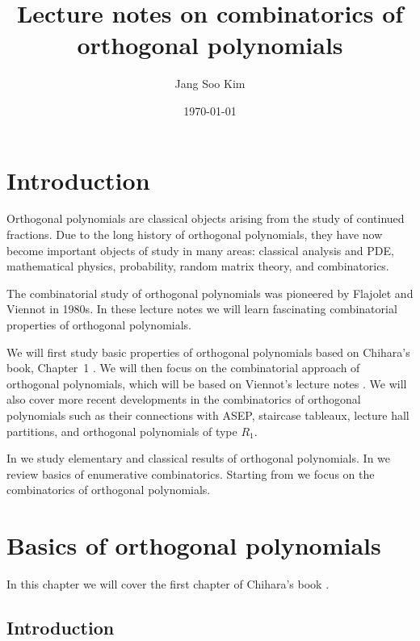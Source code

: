 \documentclass[oneside]{book}
\title{Lecture notes on combinatorics of orthogonal polynomials}
\author{Jang Soo Kim}
\date{\today}
\numberwithin{equation}{section}
\theoremstyle{definition}
\begin{document}


\maketitle
\tableofcontents


\chapter{Introduction}

Orthogonal polynomials are classical objects arising from the study of
continued fractions. Due to the long history of orthogonal
polynomials, they have now become important objects of study in many
areas: classical analysis and PDE, mathematical physics, probability,
random matrix theory, and combinatorics.

The combinatorial study of orthogonal polynomials was pioneered by
Flajolet and Viennot in 1980s. In these lecture notes we will learn
fascinating combinatorial properties of orthogonal polynomials.

We will first study basic properties of orthogonal polynomials based
on Chihara's book, Chapter~1 \cite{Chihara}. We will then focus on the
combinatorial approach of orthogonal polynomials, which will be based
on Viennot's lecture notes \cite{ViennotLN}. We will also cover more
recent developments in the combinatorics of orthogonal polynomials
such as their connections with ASEP, staircase tableaux, lecture hall
partitions, and orthogonal polynomials of type \( R_1 \).

In  we study elementary and classical
results of orthogonal polynomials. In  we
review basics of enumerative combinatorics. Starting from
 we focus on the combinatorics of
orthogonal polynomials.

\chapter{Basics of orthogonal polynomials}
\label{sec:basics-orth-polyn}

In this chapter we will cover the first chapter of Chihara's book
\cite{Chihara}.

\section{Introduction}
\end{document}
